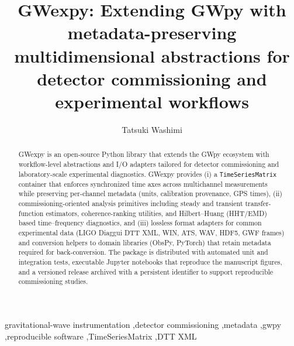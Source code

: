 \documentclass[preprint,12pt,a4paper]{elsarticle}
\begin{document}
\begin{frontmatter}

\title{GWexpy: Extending GWpy with metadata-preserving multidimensional abstractions for detector commissioning and experimental workflows}

\author[naoj]{Tatsuki Washimi}

\address[naoj]{National Astronomical Observatory of Japan (NAOJ), Mitaka, Tokyo, Japan}

\begin{abstract}
GWexpy is an open-source Python library that extends the GWpy ecosystem with workflow-level abstractions and I/O adapters tailored for detector commissioning and laboratory-scale experimental diagnostics.  GWexpy provides (i) a \texttt{TimeSeriesMatrix} container that enforces synchronized time axes across multichannel measurements while preserving per-channel metadata (units, calibration provenance, GPS times), (ii) commissioning-oriented analysis primitives including steady and transient transfer-function estimators, coherence-ranking utilities, and Hilbert–Huang (HHT/EMD) based time--frequency diagnostics, and (iii) lossless format adapters for common experimental data (LIGO Diaggui DTT XML, WIN, ATS, WAV, HDF5, GWF frames) and conversion helpers to domain libraries (ObsPy, PyTorch) that retain metadata required for back-conversion.  The package is distributed with automated unit and integration tests, executable Jupyter notebooks that reproduce the manuscript figures, and a versioned release archived with a persistent identifier to support reproducible commissioning studies.
\end{abstract}

\begin{keyword}
gravitational-wave instrumentation \sep detector commissioning \sep metadata \sep gwpy \sep reproducible software \sep TimeSeriesMatrix \sep DTT XML
\end{keyword}

\end{frontmatter}

\end{document}
